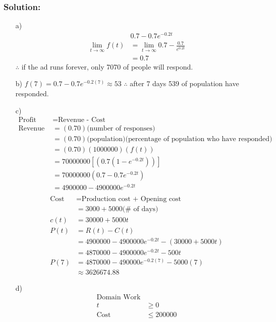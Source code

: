 \documentclass{article}
\begin{document}
\subsubsection*{Solution: }
\begin{enumerate}
    \item[a)] 
    \begin{align*}
        &0.7-0.7e^{-0.2t}\\
        \lim_{t\to \infty}f(t) &=\lim_{t\to \infty}0.7-\frac{0.7}{e^{0.2t}}\\
        &=0.7
    \end{align*}
$\therefore$ if the ad runs forever, only 7070 of people will respond. 
    \item[b)] $f(7)=0.7-0.7e^{-0.2(7)}\approx 53$
    $\therefore$ after 7 days 539 of population have responded.
    \item[c)] 
    \begin{align*}
    \text{Profit } &= \text{Revenue - Cost}\\    
    \text{Revenue }&=(0.70)\text{(number of responses)}\\
    &=(0.70)\text{(population)(percentage of population who have responded)} \\
    &=(0.70)(1000000)(f(t))\\
    &=70000000\left[(0.7(1-e^{-0.2t}))\right]\\
    &=70000000(0.7-0.7e^{-0.2t})\\
    &=4900000-4900000e^{-0.2t}\\
    \end{align*}
    \begin{align*}
    \text{Cost} &= \text{Production cost + Opening cost}\\
    &=3000+5000\text{(# of days)}\\
    c(t)&=30000+5000t\\
    P(t)&=R(t)-C(t)\\
    &=4900000-4900000e^{-0.2t}-(30000+5000t)\\
    &=4870000-4900000e^{-0.2t}-500t\\
    P(7)&=4870000-490000e^{-0.2(7)}-5000(7)\\
    &\approx 3626674.88
    \end{align*}
    \item[d)] 
    \begin{align*}
        \text{Domain Work}\\
        t &\geq 0\\
        \text{Cost} &\leq 200000\\

\end{align*}
\end{enumerate}
\end{document}
